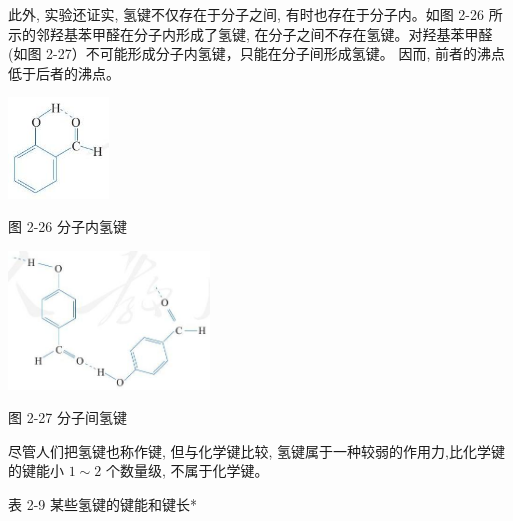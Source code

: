 \documentclass[10pt]{article}
\begin{document}
此外, 实验还证实, 氢键不仅存在于分子之间, 有时也存在于分子内。如图 2-26 所示的邻羟基苯甲醛在分子内形成了氢键, 在分子之间不存在氢键。对羟基苯甲醛 (如图 2-27）不可能形成分子内氢键，只能在分子间形成氢键。 因而, 前者的沸点低于后者的沸点。

\begin{center}
\includegraphics[max width=0.2\textwidth]{images/0190e026-5a11-7df7-bd27-54d09026ba7a_60_586054.jpg}
\end{center}

图 2-26 分子内氢键

\begin{center}
\includegraphics[max width=0.4\textwidth]{images/0190e026-5a11-7df7-bd27-54d09026ba7a_60_647091.jpg}
\end{center}

图 2-27 分子间氢键

尽管人们把氢键也称作键, 但与化学键比较, 氢键属于一种较弱的作用力,比化学键的键能小 \(1 \sim 2\) 个数量级, 不属于化学键。

表 2-9 某些氢键的键能和键长*

\begin{center}
\end{center}
\end{document}
